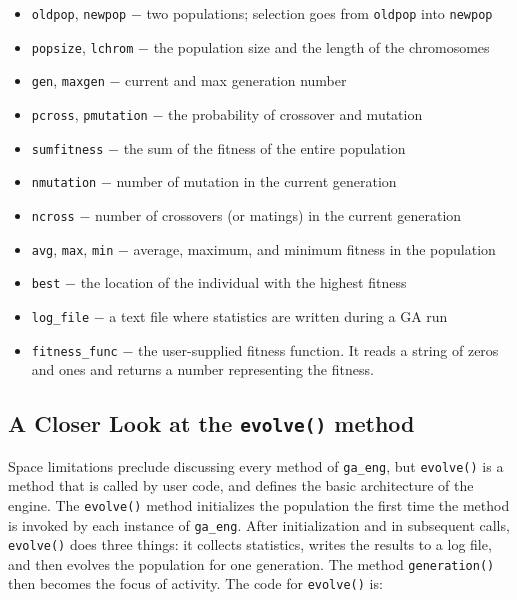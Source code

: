\begin{itemize}
\item \texttt{oldpop}, \texttt{newpop} $-$ two populations; selection
goes from \texttt{oldpop} into \texttt{newpop}
\item \texttt{popsize}, \texttt{lchrom} $-$ the population size and the
length of the chromosomes
\item \texttt{gen}, \texttt{maxgen} $-$ current and max generation
number
\item \texttt{pcross}, \texttt{pmutation} $-$ the probability of
crossover and mutation
\item \texttt{sumfitness} $-$ the sum of the fitness of the entire
population
\item \texttt{nmutation} $-$ number of mutation in the current
generation
\item \texttt{ncross} $-$ number of crossovers (or matings) in the
current generation
\item \texttt{avg}, \texttt{max}, \texttt{min} $-$ average, maximum, and
minimum fitness in the population
\item \texttt{best} $-$ the location of the individual with the highest
fitness
\item \texttt{log\_file} $-$ a text file where statistics are written
during a GA run
\item \texttt{fitness\_func} $-$ the user-supplied fitness function. It
reads a string of zeros and ones and returns a number representing the
fitness.
\end{itemize}


\subsection*{A Closer Look at the \texttt{evolve()} method}

Space limitations preclude discussing every method of
\texttt{ga\_eng}, but \texttt{evolve()} is a method that is called
by user code, and defines the basic architecture of the
engine. The \texttt{evolve()} method initializes the population the
first time the method is invoked by each instance of \texttt{ga\_eng}.
After initialization and in subsequent calls, \texttt{evolve()}
does three things: it collects statistics, writes the results to a log
file, and then evolves the population for one generation. The method
\texttt{generation()} then becomes the focus of activity. The code for
\texttt{evolve()} is:

